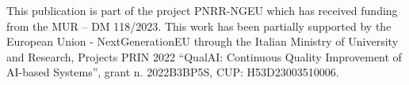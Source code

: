 This publication is part of the project PNRR-NGEU which has received funding from the MUR – DM 118/2023.
This work has been partially supported by the European Union - NextGenerationEU through the Italian
Ministry of University and Research, Projects PRIN 2022 ``QualAI: Continuous Quality Improvement of AI-based Systems'', grant n. 2022B3BP5S, CUP: H53D23003510006.

